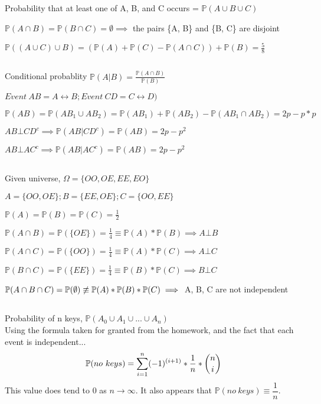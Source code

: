 \documentclass{article}
\begin{document}
\subsection{}
Probability that at least one of A, B, and C occurs = \( \mathbb{P}(A \cup B \cup C) \)

\( \mathbb{P}(A \cap B) = \mathbb{P}(B \cap C) = \emptyset \implies \) the pairs \{A, B\} and \{B, C\} are disjoint

\( \mathbb{P}((A \cup C) \cup B) = (\mathbb{P}(A) + \mathbb{P}(C) - \mathbb{P}(A \cap C)) + \mathbb{P}(B) = \frac{5}{8} \)

\subsection{}
Conditional probablity \( \mathbb{P}(A|B) = \frac{\mathbb{P}(A \cap B)}{\mathbb{P}(B)} \)

\( Event~AB = A \leftrightarrow B; Event~CD = C \leftrightarrow D) \)

\( \mathbb{P}(AB) = \mathbb{P}(AB_1 \cup AB_2) = \mathbb{P}(AB_1) + \mathbb{P}(AB_2) - \mathbb{P}(AB_1 \cap AB_2) = 2p - p*p \)

\( AB \bot CD^c \implies \mathbb{P}(AB | CD^c) = \mathbb{P}(AB) = 2p - p^2 \)

\( AB \bot AC^c \implies \mathbb{P}(AB | AC^c) = \mathbb{P}(AB) = 2p - p^2 \)

\subsection{}
Given universe, \( \Omega = \{OO, OE, EE, EO\} \)

\( A = \{OO, OE\}; B = \{EE, OE\}; C = \{OO, EE\} \)

\( \mathbb{P}(A) = \mathbb{P}(B) = \mathbb{P}(C) = \frac{1}{2} \)

\( \mathbb{P}(A \cap B) = \mathbb{P}(\{OE\}) = \frac{1}{4} \equiv \mathbb{P}(A)*\mathbb{P}(B) \implies A \bot B \)

\( \mathbb{P}(A \cap C) = \mathbb{P}(\{OO\}) = \frac{1}{4} \equiv \mathbb{P}(A)*\mathbb{P}(C) \implies A \bot C \)

\( \mathbb{P}(B \cap C) = \mathbb{P}(\{EE\}) = \frac{1}{4} \equiv \mathbb{P}(B)*\mathbb{P}(C) \implies B \bot C \)

\( \mathbb{P}(A \cap B \cap C) = \mathbb{P}({\emptyset}) \centernot\equiv \mathbb{P}(A)*\mathbb{P}(B)*\mathbb{P}(C) \implies \) A, B, C are not independent

\subsection{}
Probability of n keys, \( \mathbb{P}(A_0 \cup A_1 \cup ... \cup A_n) \) \\
Using the formula taken for granted from the homework, and the fact that each event is independent...
\begin{align*}
\mathbb{P}(no~keys) = \sum\limits_{i=1}^n (-1)^{(i+1)} * \frac{1}{n} * \dbinom{n}{i}
\end{align*}
This value does tend to 0 as \(n \rightarrow \infty \).
It also appears that \( \mathbb{P}(no~keys) \equiv \dfrac{1}{n} \).
\end{document}
